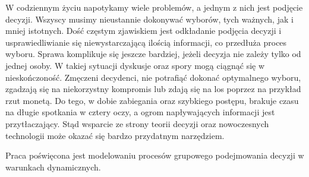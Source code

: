 W codziennym życiu napotykamy wiele problemów, a jednym z nich jest podjęcie
decyzji. Wszyscy musimy nieustannie dokonywać wyborów, tych ważnych, jak i mniej
istotnych. Dość częstym zjawiskiem jest odkładanie podjęcia decyzji i
usprawiedliwianie się niewystarczającą ilością informacji, co przedłuża proces
wyboru. Sprawa komplikuje się jeszcze bardziej, jeżeli decyzja nie zależy tylko
od jednej osoby. W takiej sytuacji dyskusje oraz spory mogą ciągnąć się w
nieskończoność. Zmęczeni decydenci, nie potrafiąć dokonać optymalnego wyboru,
zgadzają się na niekorzystny kompromis lub zdają się na los poprzez na
przykład rzut monetą. Do tego, w dobie zabiegania oraz szybkiego postępu,
brakuje czasu na długie spotkania w cztery oczy, a ogrom napływających
informacji jest przytłaczający. Stąd wsparcie ze strony teorii decyzji oraz
nowoczesnych technologii może okazać się bardzo przydatnym narzędziem.

Praca poświęcona jest modelowaniu procesów grupowego podejmowania decyzji w
warunkach dynamicznych. 
